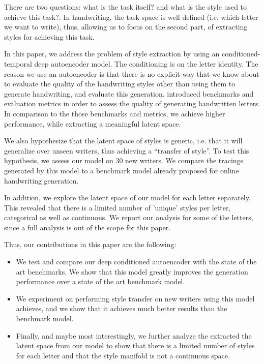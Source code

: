 \documentclass[conference]{IEEEtran}
\begin{document}
\par There are two questions: what is the task itself? and what is the style used to achieve this task?. In handwriting, the task space is well defined (i.e. which letter we want to write), thus, allowing us to focus on the second part, of extracting styles for achieving this task.

In this paper, we address the problem of style extraction by using an conditioned-temporal deep autoencoder model. The conditioning is on the letter identity. The reason we use an autoencoder is that there is no explicit way that we know about to evaluate the quality of the handwriting styles other than using them to generate handwriting, and evaluate this generation. \cite{mohammed2018DTL} introduced benchmarks and evaluation metrics  in order to assess the quality of generating handwritten letters. In comparison to the those benchmarks and metrics, we achieve higher performance, while extracting a meaningful latent space. 

\par We also hypothesize that the latent space of styles is generic, i.e. that it will generalize over unseen writers, thus achieving a ``transfer of style''. To test this hypothesis, we assess our model on 30 new writers. We compare the tracings generated by this model to a benchmark model already proposed for online handwriting generation.

\par In addition, we explore the latent space of our model for each letter separately. This revealed  that there is a limited number of 'unique' styles per letter, categorical as well as continuous. We report our analysis for some of the letters, since a full analysis is out of the scope for this paper.

\par Thus, our contributions in this paper are the following:
\begin{itemize}
    \item We test and compare our deep conditioned autoencoder  with the state of the art benchmarks. We show that this model greatly improves the generation performance over a state of the art benchmark model.
    \item We experiment on performing style transfer on new writers using this model achieves, and we show that it achieves much better results than the benchmark model.
    \item Finally, and maybe most interestingly, we further analyze the extracted the latent space from our model to show that there is a limited number of styles for each letter and that the style manifold is not a continuous space.
\end{itemize}
\end{document}
